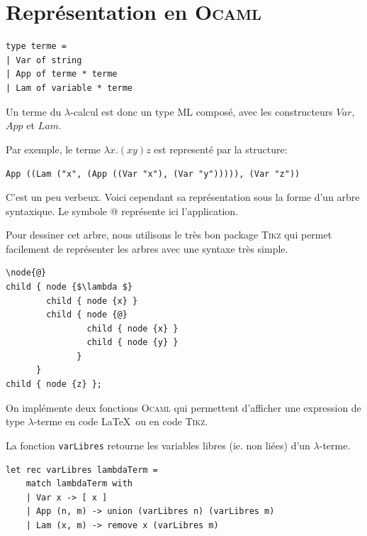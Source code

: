 \section{Représentation en \textsc{Ocaml}}

\begin{Verbatim}
type terme =
| Var of string
| App of terme * terme
| Lam of variable * terme
\end{Verbatim}


Un terme du $\lambda $-calcul est donc un type ML compos\'{e}, avec les constructeurs $Var$, $App$ et $Lam$.

Par exemple, le terme $ \lambda x.(x y) z $ est represent\'{e} par la structure:



\verb+App ((Lam ("x", (App ((Var "x"), (Var "y"))))), (Var "z"))+


C'est un peu verbeux.
Voici cependant sa représentation sous la forme d'un arbre syntaxique. Le symbole @ repr\'{e}sente ici l'application.
\begin{center}
\end{center}

Pour dessiner cet arbre, nous utilisons le tr\`{e}s bon package \textsc{Tikz} qui permet facilement de repr\'{e}senter
les arbres avec une syntaxe très simple.
\begin{Verbatim}
\node{@}
child { node {$\lambda $}
		child { node {x} }
		child { node {@}
				child { node {x} }
				child { node {y} }
			  }
	  }
child { node {z} };
\end{Verbatim}

On impl\'{e}mente deux fonctions \textsc{Ocaml}
qui permettent  d'afficher une expression de type $\lambda $-terme en code \LaTeX\ ou en code \textsc{Tikz}.



La fonction \verb+varLibres+ retourne les variables libres (ie. non li\'{e}es) d'un $\lambda $-terme.
\begin{Verbatim}
let rec varLibres lambdaTerm =
	match lambdaTerm with
	| Var x -> [ x ]
	| App (n, m) -> union (varLibres n) (varLibres m)
	| Lam (x, m) -> remove x (varLibres m)
\end{Verbatim}


